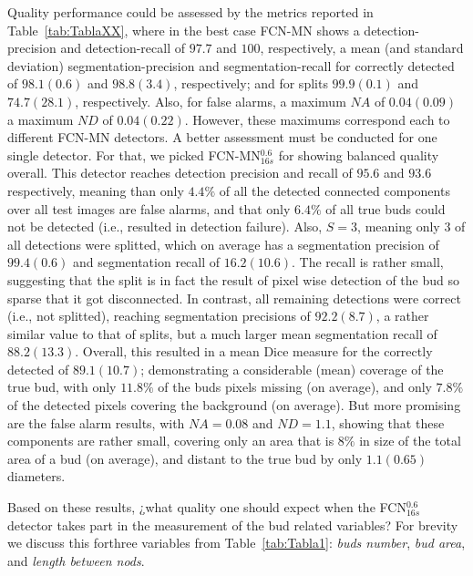 \documentclass[a4paper,authoryear,review]{elsarticle}
\begin{document}
Quality performance could be assessed by the metrics reported in  Table~\ref{tab:TablaXX}, where in the best case FCN-MN shows a  detection-precision and detection-recall of $97.7$ and $100$, respectively, a mean (and standard deviation) segmentation-precision and segmentation-recall for correctly detected of $98.1(0.6)$ and $98.8(3.4)$, respectively; and for splits $99.9(0.1)$ and $74.7(28.1)$, respectively. Also, for false alarms, a maximum  $NA$ of  $0.04(0.09)$ a maximum  $ND$ of $0.04 (0.22)$.  
%
However, these maximums correspond each to different FCN-MN detectors. A better assessment must be conducted for one single detector. For that, we picked FCN-MN$_{16s}^{0.6}$ for showing balanced quality overall. This detector reaches detection precision and recall of $95.6$ and $93.6$ respectively, meaning than only $4.4\%$ of all the detected connected components over all test images are false alarms, and that only $6.4\%$ of all true buds could not be detected (i.e., resulted in detection failure).
%
Also, $S=3$, meaning only $3$ of all detections were splitted, which on average has a segmentation precision of $99.4(0.6)$ and segmentation recall of $16.2(10.6)$. The recall is rather small, suggesting that the split is in fact the result of pixel wise detection of the bud so sparse that it got disconnected. In contrast, all remaining detections were correct (i.e., not splitted), reaching segmentation precisions of $92.2(8.7)$, a rather similar value to that of splits, but a much larger mean segmentation recall of $88.2(13.3)$. Overall, this resulted in a mean Dice measure for the correctly detected of $89.1(10.7)$; demonstrating a considerable (mean) coverage of the true bud, with only $11.8\%$ of the buds pixels missing (on average), and only $7.8\%$ of the detected pixels covering the background (on average).
%
But more promising are the false alarm results, with $NA=0.08$ and $ND=1.1$, showing that these components are rather small, covering only an area that is $8\%$ in size of the total area of a bud (on average), and distant to the true bud by only $1.1 (0.65)$ diameters.

Based on these results, ¿what quality one should expect when the FCN$_{16s}^{0.6}$ detector takes part in the measurement of the bud related variables? For brevity we discuss this  forthree variables from Table~\ref{tab:Tabla1}: \emph{buds number}, \emph{bud area}, and \emph{length between nods}.
\end{document}

